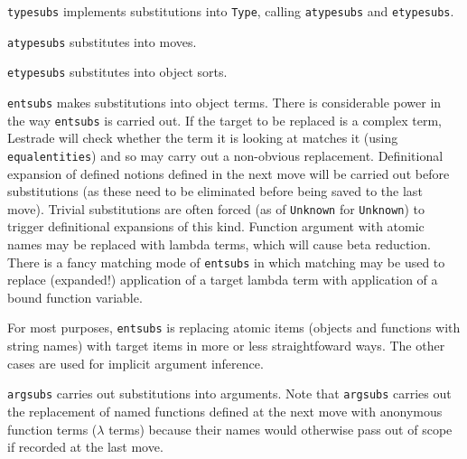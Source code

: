 \documentclass{article}
\begin{document}
{\tt typesubs} implements substitutions into {\tt Type}, calling {\tt atypesubs} and {\tt etypesubs}.

{\tt atypesubs} substitutes into moves.

{\tt etypesubs} substitutes into object sorts.

{\tt entsubs} makes substitutions into object terms.  There is considerable power in the way {\tt entsubs} is carried out.  If the target to be replaced is a complex term, Lestrade will check whether the term it is looking at matches it (using {\tt equalentities}) and so may carry out a non-obvious replacement.
Definitional expansion of defined notions defined in the next move will be carried out before substitutions (as these need to be eliminated before being saved to the last move).  Trivial substitutions are often forced (as of {\tt Unknown} for {\tt Unknown}) to trigger definitional expansions of this kind.
Function argument with atomic names may be replaced with lambda terms, which will cause beta reduction.  There is a fancy matching mode of {\tt entsubs} in which matching may be used to replace (expanded!) application of a target lambda term with application of a bound function variable.

For most purposes, {\tt entsubs} is replacing atomic items (objects and functions with string names) with target items in more or less straightfoward ways.  The other cases are used for implicit argument inference.

{\tt argsubs} carries out substitutions into arguments.  Note that {\tt argsubs} carries out the replacement of named functions defined at the next move with anonymous function terms ($\lambda$ terms) because their names would otherwise pass out of scope if recorded at the last move.
\end{document}
